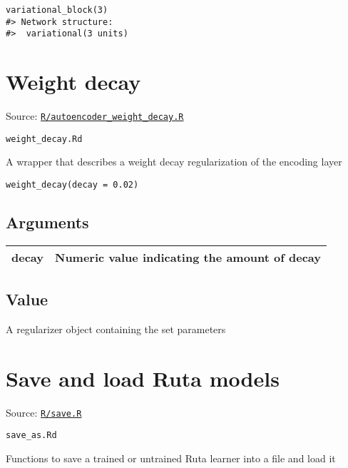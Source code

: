 \begin{verbatim}
variational_block(3)
#> Network structure:
#>  variational(3 units)
\end{verbatim}

\section{Weight decay}\label{weight-decay}

Source:
\href{https://github.com/fdavidcl/ruta/blob/master/R/autoencoder_weight_decay.R}{\texttt{R/autoencoder\_weight\_decay.R}}

\texttt{weight\_decay.Rd}

A wrapper that describes a weight decay regularization of the encoding
layer

\begin{verbatim}
weight_decay(decay = 0.02)
\end{verbatim}

\hypertarget{arguments}{\subsection{\texorpdfstring{\protect\hyperlink{arguments}{}Arguments}{Arguments}}\label{arguments}}

\begin{longtable}[c]{@{}>{\small}p{3cm}>{\raggedright}p{12.5cm}@{}}
\toprule
decay & Numeric value indicating the amount of decay\tabularnewline
\bottomrule
\end{longtable}

\hypertarget{value}{\subsection{\texorpdfstring{\protect\hyperlink{value}{}Value}{Value}}\label{value}}

A regularizer object containing the set parameters

\section{Save and load Ruta models}\label{save-and-load-ruta-models}

Source:
\href{https://github.com/fdavidcl/ruta/blob/master/R/save.R}{\texttt{R/save.R}}

\texttt{save\_as.Rd}

Functions to save a trained or untrained Ruta learner into a file and
load it

